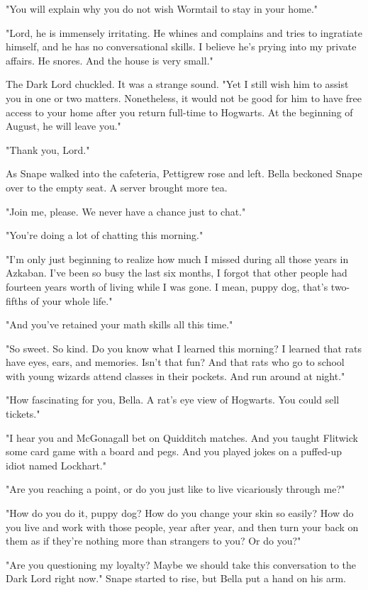\documentclass[a4paper,11pt]{article}
\begin{document}
"You will explain why you do not wish Wormtail to stay in your home."

"Lord, he is immensely irritating. He whines and complains and tries to ingratiate himself, and he has no conversational skills. I believe he's prying into my private affairs. He snores. And the house is very small."

The Dark Lord chuckled. It was a strange sound. "Yet I still wish him to assist you in one or two matters. Nonetheless, it would not be good for him to have free access to your home after you return full-time to Hogwarts. At the beginning of August, he will leave you."

"Thank you, Lord."

As Snape walked into the cafeteria, Pettigrew rose and left. Bella beckoned Snape over to the empty seat. A server brought more tea.

"Join me, please. We never have a chance just to chat."

"You're doing a lot of chatting this morning."

"I'm only just beginning to realize how much I missed during all those years in Azkaban. I've been so busy the last six months, I forgot that other people had fourteen years worth of living while I was gone. I mean, puppy dog, that's two-fifths of your whole life."

"And you've retained your math skills all this time."

"So sweet. So kind. Do you know what I learned this morning? I learned that rats have eyes, ears, and memories. Isn't that fun? And that rats who go to school with young wizards attend classes in their pockets. And run around at night."

"How fascinating for you, Bella. A rat's eye view of Hogwarts. You could sell tickets."

"I hear you and McGonagall bet on Quidditch matches. And you taught Flitwick some card game with a board and pegs. And you played jokes on a puffed-up idiot named Lockhart."

"Are you reaching a point, or do you just like to live vicariously through me?"

"How do you do it, puppy dog? How do you change your skin so easily? How do you live and work with those people, year after year, and then turn your back on them as if they're nothing more than strangers to you? Or do you?"

"Are you questioning my loyalty? Maybe we should take this conversation to the Dark Lord right now." Snape started to rise, but Bella put a hand on his arm.
\end{document}
